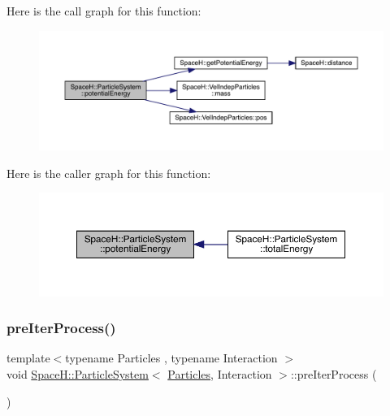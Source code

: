 Here is the call graph for this function\+:
\nopagebreak
\begin{figure}[H]
\begin{center}
\leavevmode
\includegraphics[width=350pt]{class_space_h_1_1_particle_system_a3b8fcc8922c6c32d888e0493d5058ae4_cgraph}
\end{center}
\end{figure}
Here is the caller graph for this function\+:
\nopagebreak
\begin{figure}[H]
\begin{center}
\leavevmode
\includegraphics[width=350pt]{class_space_h_1_1_particle_system_a3b8fcc8922c6c32d888e0493d5058ae4_icgraph}
\end{center}
\end{figure}
\mbox{\label{class_space_h_1_1_particle_system_a7d20b605ada4cf4b19f5e7e4842a2200}} 
\subsubsection{\texorpdfstring{pre\+Iter\+Process()}{preIterProcess()}}
{\footnotesize\ttfamily template$<$typename Particles , typename Interaction $>$ \\
void \mbox{\hyperlink{class_space_h_1_1_particle_system}{Space\+H\+::\+Particle\+System}}$<$ \mbox{\hyperlink{struct_space_h_1_1_particles}{Particles}}, Interaction $>$\+::pre\+Iter\+Process (\begin{DoxyParamCaption}{ }\end{DoxyParamCaption})\hspace{0.3cm}{\ttfamily [inline]}}



